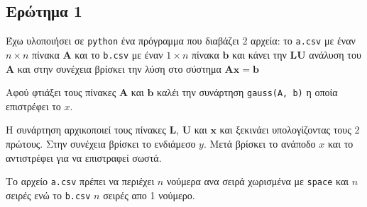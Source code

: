 \subsection{Ερώτημα 1}
Έχω υλοποιήσει σε \texttt{python} ένα πρόγραμμα που διαβάζει 2 αρχεία:
το \texttt{a.csv} με έναν $n\times n$ πίνακα $\mathbf{A}$ και το \texttt{b.csv}
με έναν $1\times n$ πίνακα $\mathbf{b}$ και κάνει την $\mathbf{LU}$
ανάλυση του $\mathbf{A}$ και στην συνέχεια βρίσκει την λύση
στο σύστημα $\mathbf{Ax} = \mathbf{b}$

Αφού φτιάξει τους πίνακες $\mathbf{A}$ και $\mathbf{b}$
καλέι την συνάρτηση \texttt{gauss(A, b)} η οποία επιστρέφει το $x$.

Η συνάρτηση αρχικοποιεί τους πίνακες $\mathbf{L}$, $\mathbf{U}$ και
$\mathbf{x}$ και ξεκινάει υπολογίζοντας τους 2 πρώτους. Στην συνέχεια
βρίσκει το ενδιάμεσο $y$. Μετά βρίσκει το ανάποδο $x$ και το αντιστρέφει
για να επιστραφεί σωστά.

Το αρχείο \texttt{a.csv} πρέπει να περιέχει $n$ νούμερα ανα σειρά χωρισμένα με
\texttt{space} και $n$ σειρές ενώ το \texttt{b.csv} $n$ σειρές απο 1 νούμερο.

